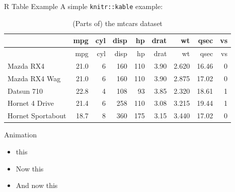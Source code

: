 \documentclass[ignorenonframetext,]{beamer}
\providecommand{\tightlist}{%
  \setlength{\itemsep}{0pt}\setlength{\parskip}{0pt}}
\begin{document}
\begin{frame}[fragile]{R Table Example}
\protect\hypertarget{r-table-example}{}
A simple \texttt{knitr::kable} example:

\begin{longtable}[]{@{}lrrrrrrrr@{}}
\caption{(Parts of) the mtcars dataset}\tabularnewline
\toprule
& mpg & cyl & disp & hp & drat & wt & qsec & vs\tabularnewline
\midrule
\endfirsthead
\toprule
& mpg & cyl & disp & hp & drat & wt & qsec & vs\tabularnewline
\midrule
\endhead
Mazda RX4 & 21.0 & 6 & 160 & 110 & 3.90 & 2.620 & 16.46 &
0\tabularnewline
Mazda RX4 Wag & 21.0 & 6 & 160 & 110 & 3.90 & 2.875 & 17.02 &
0\tabularnewline
Datsun 710 & 22.8 & 4 & 108 & 93 & 3.85 & 2.320 & 18.61 &
1\tabularnewline
Hornet 4 Drive & 21.4 & 6 & 258 & 110 & 3.08 & 3.215 & 19.44 &
1\tabularnewline
Hornet Sportabout & 18.7 & 8 & 360 & 175 & 3.15 & 3.440 & 17.02 &
0\tabularnewline
\bottomrule
\end{longtable}
\end{frame}

\begin{frame}{Animation}
\protect\hypertarget{animation}{}
\begin{itemize}[<+->]
\tightlist
\item
  this
\item
  Now this
\item
  And now this
\end{itemize}
\end{frame}
\end{document}
